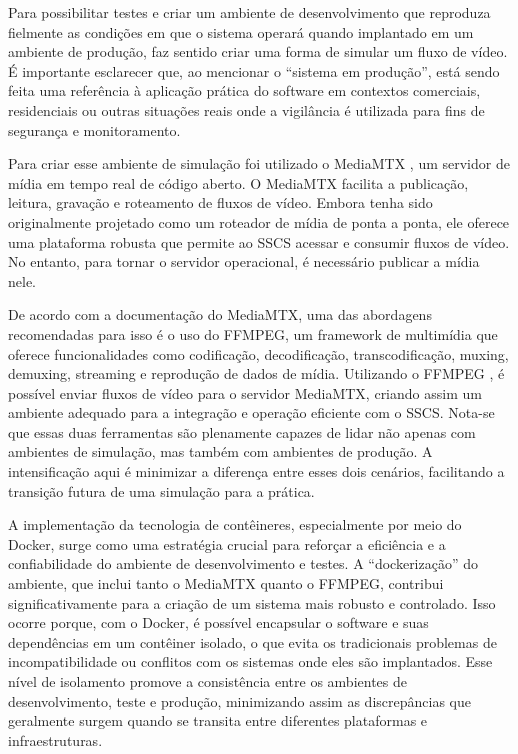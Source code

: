 \documentclass[12pt, %
openright, 
oneside, %
a4paper,    %
brazil]{facom-ufu-abntex2}
\begin{document}
Para possibilitar testes e criar um ambiente de desenvolvimento que reproduza
fielmente as condições em que o sistema operará quando implantado em um
ambiente de produção, faz sentido criar uma forma de simular um fluxo de vídeo.
É importante esclarecer que, ao mencionar o ``sistema em produção'', está sendo
feita uma referência à aplicação prática do software em contextos comerciais,
residenciais ou outras situações reais onde a vigilância é utilizada para fins
de segurança e monitoramento.

Para criar esse ambiente de simulação foi utilizado o MediaMTX \cite{mediamtx},
um servidor de mídia em tempo real de código aberto. O MediaMTX facilita a
publicação, leitura, gravação e roteamento de fluxos de vídeo. Embora tenha
sido originalmente projetado como um roteador de mídia de ponta a ponta, ele
oferece uma plataforma robusta que permite ao SSCS acessar e consumir fluxos de
vídeo. No entanto, para tornar o servidor operacional, é necessário publicar a
mídia nele.

De acordo com a documentação do MediaMTX, uma das abordagens recomendadas para
isso é o uso do FFMPEG, um framework de multimídia que oferece funcionalidades
como codificação, decodificação, transcodificação, muxing, demuxing, streaming
e reprodução de dados de mídia. Utilizando o FFMPEG \cite{ffmpeg}, é possível
enviar fluxos de vídeo para o servidor MediaMTX, criando assim um ambiente
adequado para a integração e operação eficiente com o SSCS. Nota-se que essas
duas ferramentas são plenamente capazes de lidar não apenas com ambientes de
simulação, mas também com ambientes de produção. A intensificação aqui é
minimizar a diferença entre esses dois cenários, facilitando a transição futura
de uma simulação para a prática.

A implementação da tecnologia de contêineres, especialmente por meio do Docker,
surge como uma estratégia crucial para reforçar a eficiência e a confiabilidade
do ambiente de desenvolvimento e testes. A ``dockerização'' do ambiente, que
inclui tanto o MediaMTX quanto o FFMPEG, contribui significativamente para a
criação de um sistema mais robusto e controlado. Isso ocorre porque, com o
Docker, é possível encapsular o software e suas dependências em um contêiner
isolado, o que evita os tradicionais problemas de incompatibilidade ou
conflitos com os sistemas onde eles são implantados. Esse nível de isolamento
promove a consistência entre os ambientes de desenvolvimento, teste e produção,
minimizando assim as discrepâncias que geralmente surgem quando se transita
entre diferentes plataformas e infraestruturas.
\end{document}
